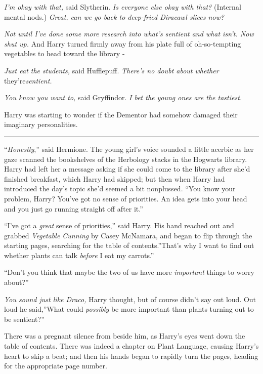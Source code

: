 \emph{I'm okay with that,} said Slytherin. \emph{Is everyone else okay
with that?} (Internal mental nods.) \emph{Great, can we go back to
deep-fried Diracawl slices now?}

\emph{Not until I've done some more research into what's sentient and
what isn't. Now shut up.} And Harry turned firmly away from his plate
full of oh-so-tempting vegetables to head toward the library -

\emph{Just eat the students,} said Hufflepuff. \emph{There's no doubt
about whether} they're\emph{sentient.}

\emph{You know you want to,} said Gryffindor. \emph{I bet the young ones
are the tastiest.}

Harry was starting to wonder if the Dementor had somehow damaged their
imaginary personalities.

\begin{center}\rule{3in}{0.4pt}\end{center}

``\emph{Honestly},'' said Hermione. The young girl's voice sounded a
little acerbic as her gaze scanned the bookshelves of the Herbology
stacks in the Hogwarts library. Harry had left her a message asking if
she could come to the library after she'd finished breakfast, which
Harry had skipped; but then when Harry had introduced the day's topic
she'd seemed a bit nonplussed. ``You know your problem, Harry? You've
got no sense of priorities. An idea gets into your head and you just go
running straight off after it.''

``I've got a \emph{great} sense of priorities,'' said Harry. His hand
reached out and grabbed \emph{Vegetable Cunning} by Casey McNamara, and
began to flip through the starting pages, searching for the table of
contents.''That's why I want to find out whether plants can talk
\emph{before} I eat my carrots.''

``Don't you think that maybe the two of us have more \emph{important}
things to worry about?''

\emph{You sound just like Draco,} Harry thought, but of course didn't
say out loud. Out loud he said,''What could \emph{possibly} be more
important than plants turning out to be sentient?''

There was a pregnant silence from beside him, as Harry's eyes went down
the table of contents. There was indeed a chapter on Plant Language,
causing Harry's heart to skip a beat; and then his hands began to
rapidly turn the pages, heading for the appropriate page number.

